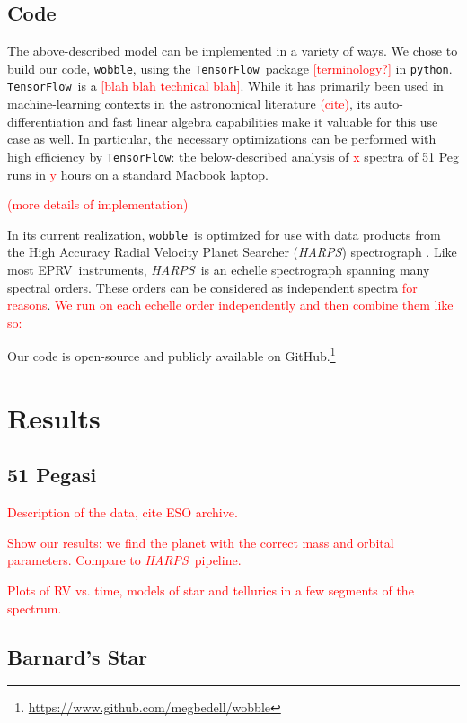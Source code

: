 \documentclass[twocolumn]{aastex62}
\newcommand{\todo}[1]{\textcolor{red}{#1}}  %
\newcommand{\acronym}[1]{{\small{#1}}}
\newcommand{\project}[1]{\textsl{#1}}
\newcommand{\code}[1]{\texttt{#1}}
\newcommand{\HARPS}{\project{\acronym{HARPS}}}
\newcommand{\EPRV}{\acronym{EPRV}}
\newcommand{\wobble}{\code{wobble}}
\newcommand{\TF}{\code{TensorFlow}}
\newcommand{\Mdwarf}{Barnard's Star}
\begin{document}
\subsection{Code}

The above-described model can be implemented in a variety of ways. We chose to build our code, \wobble, using the \TF\ package \todo{[terminology?]} in \code{python}. \TF\ is a \todo{[blah blah technical blah]}. While it has primarily been used in machine-learning contexts in the astronomical literature \todo{(cite)}, its auto-differentiation and fast linear algebra capabilities make it valuable for this use case as well. In particular, the necessary optimizations can be performed with high efficiency by \TF: the below-described analysis of \todo{x} spectra of 51 Peg runs in \todo{y} hours on a standard Macbook laptop.

\todo{(more details of implementation)}

In its current realization, \wobble\ is optimized for use with data products from the High Accuracy Radial Velocity Planet Searcher (\HARPS) spectrograph \citep{Mayor2003}. Like most \EPRV\ instruments, \HARPS\ is an echelle spectrograph spanning many spectral orders. These orders can be considered as independent spectra \todo{for reasons}. \todo{We run on each echelle order independently and then combine them like so:}


Our code is open-source and publicly available on GitHub.\footnote{\url{https://www.github.com/megbedell/wobble}}



\section{Results}
\label{s:results}
\subsection{51 Pegasi}

\todo{Description of the data, cite \acronym{ESO} archive.}

\todo{Show our results: we find the planet with the correct mass and orbital parameters. Compare to \HARPS\ pipeline.}

\todo{Plots of RV vs. time, models of star and tellurics in a few segments of the spectrum.}

\subsection{\Mdwarf}
\end{document}
